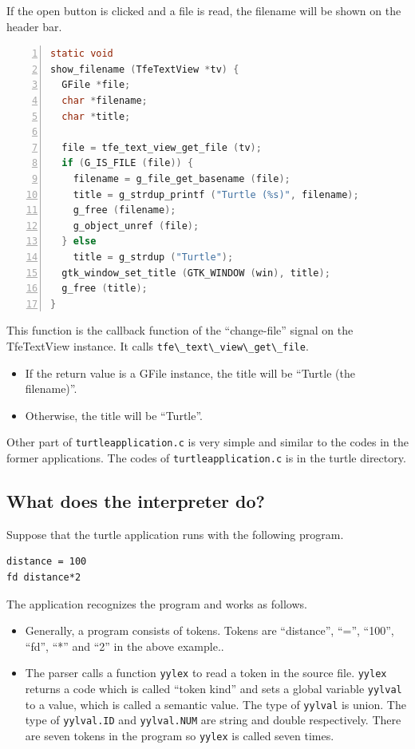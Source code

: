 If the open button is clicked and a file is read, the filename will be
shown on the header bar.

\begin{lstlisting}[language=C, numbers=left]
static void
show_filename (TfeTextView *tv) {
  GFile *file;
  char *filename;
  char *title;

  file = tfe_text_view_get_file (tv);
  if (G_IS_FILE (file)) {
    filename = g_file_get_basename (file);
    title = g_strdup_printf ("Turtle (%s)", filename);
    g_free (filename);
    g_object_unref (file);
  } else
    title = g_strdup ("Turtle");
  gtk_window_set_title (GTK_WINDOW (win), title);
  g_free (title);
}
\end{lstlisting}

This function is the callback function of the ``change-file'' signal on
the TfeTextView instance. It calls
\passthrough{\lstinline!tfe\_text\_view\_get\_file!}.

\begin{itemize}
\tightlist
\item
  If the return value is a GFile instance, the title will be ``Turtle
  (the filename)''.
\item
  Otherwise, the title will be ``Turtle''.
\end{itemize}

Other part of \passthrough{\lstinline!turtleapplication.c!} is very
simple and similar to the codes in the former applications. The codes of
\passthrough{\lstinline!turtleapplication.c!} is in the turtle
directory.

\subsection{What does the interpreter
do?}\label{what-does-the-interpreter-do}

Suppose that the turtle application runs with the following program.

\begin{lstlisting}
distance = 100
fd distance*2
\end{lstlisting}

The application recognizes the program and works as follows.

\begin{itemize}
\tightlist
\item
  Generally, a program consists of tokens. Tokens are ``distance'',
  ``='', ``100'', ``fd'', ``*'' and ``2'' in the above example..
\item
  The parser calls a function \passthrough{\lstinline!yylex!} to read a
  token in the source file. \passthrough{\lstinline!yylex!} returns a
  code which is called ``token kind'' and sets a global variable
  \passthrough{\lstinline!yylval!} to a value, which is called a
  semantic value. The type of \passthrough{\lstinline!yylval!} is union.
  The type of \passthrough{\lstinline!yylval.ID!} and
  \passthrough{\lstinline!yylval.NUM!} are string and double
  respectively. There are seven tokens in the program so
  \passthrough{\lstinline!yylex!} is called seven times.
\end{itemize}

